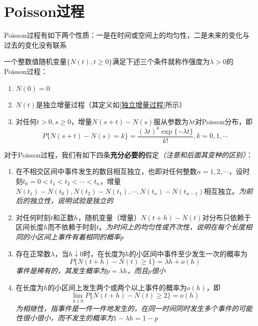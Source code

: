 \documentclass[]{report}
\begin{document}
	\section{Poisson过程}
		Poisson过程有如下两个性质：一是在时间或空间上的均匀性，二是未来的变化与过去的变化没有联系
		\begin{definition}[Poisson过程]
			一个整数值随机变量$\{N(t),t\ge0\}$满足下述三个条件就称作强度为$\lambda>0$的Poisson过程：
			\begin{enumerate}
				\item $N(0)=0$
				\item $N(t)$是独立增量过程（其定义如\ref{独立增量过程}所示）
				\item 对任何$t>0,s\ge0$，增量$N(s+t)-N(s)$服从参数为$\lambda t$对Poisson分布，即\[P\{N(s+t)-N(s)=k\}=\frac{(\lambda t)^k\exp\{-\lambda t\}}{k!},k=0,1,\cdots\]
			\end{enumerate}
		\end{definition}\par
		\begin{definition}
			对于Poisson过程，我们有如下四条\textbf{充分必要的}假定\textit{（注意和后面其变种的区别）}：
			\begin{enumerate}
				\item 在不相交区间中事件发生的数目相互独立，也即对任何整数$n=1,2,\cdots$，设时刻$t_0=0<t_1<t_2<\cdots<t_n$，增量$N(t_1)-N(t_0),N(t_2)-N(t_1),\cdots,N(t_n)-N(t_{n-1})$相互独立。\textit{为前后的独立性，说明试验是独立的}
				\item 对任何时刻$t$和正数$h$，随机变量（增量）$N(t+h)-N(t)$对分布只依赖于区间长度$h$而不依赖于时刻$t$。\textit{为时间上的均匀性或齐次性，说明在每个长度相同的小区间上事件有着相同的概率$p$}
				\item 存在正常数$\lambda$，当$h\downarrow0$时，在长度为$h$的小区间中事件至少发生一次的概率为\[P\{N(t+h)-N(t)\ge1\}=\lambda h+o(h)\]\textit{事件是稀有的，其发生概率为$p=\lambda h$，而且$p$很小}
				\item 在长度为$h$的小区间上发生两个或两个以上事件的概率为$o(h)$，即\[\lim_{h\downarrow0}P\{N(t+h)-N(t)\ge2\}=o(h)\]\textit{为相继性，指事件是一件一件地发生的，在同一时间同时发生多个事件的可能性很小很小，而不发生的概率为$1-\lambda h=1-p$}
			\end{enumerate}
		\end{definition}
\end{document}
